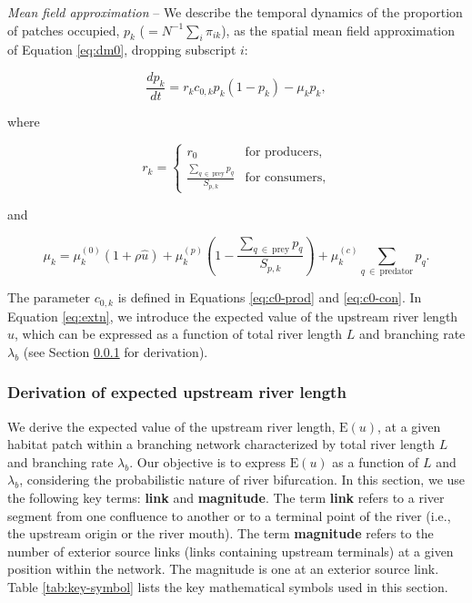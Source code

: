 \documentclass[11pt, class=article, crop=false]{standalone}
\begin{document}
\textit{Mean field approximation} --
We describe the temporal dynamics of the proportion of patches occupied, $p_k$ ($= N^{-1} \sum_i \pi_{ik}$), as the spatial mean field approximation of Equation \ref{eq:dm0}, dropping subscript $i$:

\begin{equation}
    \frac{dp_k}{dt} = r_{k} c_{0, k} p_{k} (1 - p_{k}) - \mu_{k} p_{k},
    \label{eq:master}
\end{equation}

where

\begin{equation}
    r_{k} = 
    \begin{cases}
        r_0 & \text{for producers,}\\
        \frac{\sum_{q~\in~\text{prey}} p_{q}}{S_{p,k}} & \text{for consumers,}
    \end{cases}
\end{equation}

and

\begin{equation}
    \mu_{k} = 
        \mu_{k}^{(0)} (1 + \rho \hat{u}) + 
        \mu_{k}^{(p)} \left(1 - \frac{\sum_{q~\in~\text{prey}} p_{q}}{S_{p, k}} \right) + 
        \mu_{k}^{(c)} \sum_{q~\in~\text{predator}} p_{q}.
    \label{eq:extn}    
\end{equation}

The parameter $c_{0, k}$ is defined in Equations \ref{eq:c0-prod} and \ref{eq:c0-con}. 
In Equation \ref{eq:extn}, we introduce the expected value of the upstream river length $\hat{u}$, which can be expressed as a function of total river length $L$ and branching rate $\lambda_b$ (see Section \ref{updist} for derivation).

\subsubsection{Derivation of expected upstream river length} \label{updist}

We derive the expected value of the upstream river length, $\mbox{E}(u)$, at a given habitat patch within a branching network characterized by total river length $L$ and branching rate $\lambda_b$.
Our objective is to express $\mbox{E}(u)$ as a function of $L$ and $\lambda_b$, considering the probabilistic nature of river bifurcation.
In this section, we use the following key terms: \textbf{link} and \textbf{magnitude}.
The term \textbf{link} refers to a river segment from one confluence to another or to a terminal point of the river (i.e., the upstream origin or the river mouth).
The term \textbf{magnitude} refers to the number of exterior source links (links containing upstream terminals) at a given position within the network. The magnitude is one at an exterior source link.
Table \ref{tab:key-symbol} lists the key mathematical symbols used in this section.
\end{document}
